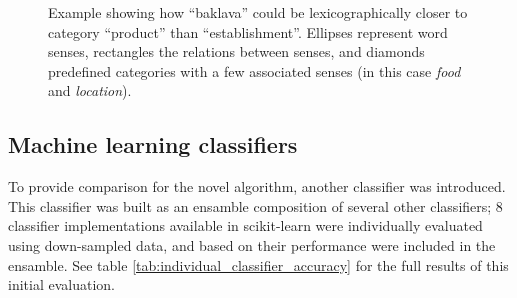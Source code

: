 \documentclass[a4paper,11pt]{kth-mag}
\begin{document}
\begin{figure}[t]
  \centering
  \caption{Example showing how ``baklava'' could be lexicographically closer to category ``product'' than ``establishment''. Ellipses represent word senses, rectangles the relations between senses, and diamonds predefined categories with a few associated senses (in this case \emph{food} and \emph{location}).}
  \label{fig:baklava_lex}
\end{figure}

\clearpage
\subsection{Machine learning classifiers}
To provide comparison for the novel algorithm, another classifier was introduced.
This classifier was built as an ensamble composition of several other classifiers;
8 classifier implementations available in scikit-learn\cite{scikit-learn} were individually evaluated using down-sampled data, and based on their performance  %
were included in the ensamble. See table \ref{tab:individual_classifier_accuracy} for the full results of this initial evaluation.
\end{document}
